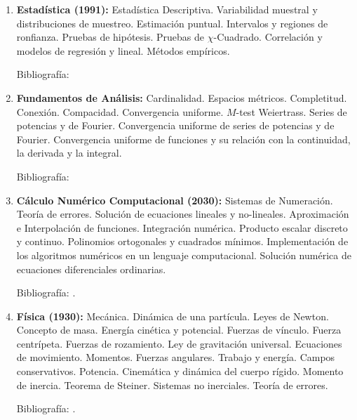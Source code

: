 \documentclass[a4paper, 12pt]{article}
\begin{document}
\begin{enumerate}
 \item \textbf{Estadística (1991):} Estadística Descriptiva. Variabilidad muestral y distribuciones de muestreo. Estimación puntual. Intervalos y regiones de ronfianza. Pruebas de hipótesis. Pruebas de $\chi$-Cuadrado. Correlación  y modelos de regresión y   lineal. Métodos empíricos. 

Bibliografía: \cite{wasserman, devore, witten, boente, mosche, johnku, triola}
 
\item \textbf{Fundamentos de Análisis:} Cardinalidad. Espacios métricos. Completitud. Conexión. Compacidad. Convergencia uniforme. $M$-test  Weiertrass. Series de potencias y de Fourier. Convergencia uniforme de series de potencias y de Fourier. Convergencia  uniforme de funciones y su relación con la continuidad, la  derivada y la  integral. 

Bibliografía: \cite{RogerGodement658,StephenAbbott134,Simmons671,MichealOSearcoid674,SatishShirali675,VictorBryant676,J.Dieudonne678,WalterRudin681,NikolaosKatzourakis684,VilmosKomornik685,VicenteMontesinos686}





\item\textbf{Cálculo Numérico Computacional (2030):} Sistemas de Numeración.
Teoría de errores. Solución de ecuaciones lineales y no-lineales.
Aproximación e Interpolación de funciones. Integración numérica.
Producto escalar discreto y continuo. Polinomios ortogonales y
cuadrados mínimos. Implementación de los algoritmos numéricos en
un lenguaje computacional. Solución numérica de ecuaciones diferenciales ordinarias.

Bibliografía: \cite{burden, cheney}.









\item\textbf{Física (1930):} Mecánica. Dinámica de una partícula. Leyes
de Newton. Concepto de masa. Energía cinética y potencial. Fuerzas
de vínculo. Fuerza centrípeta. Fuerzas de rozamiento. Ley de
gravitación universal. Ecuaciones de movimiento. Momentos. Fuerzas
angulares. Trabajo y energía. Campos conservativos.
Potencia. Cinemática y  dinámica del cuerpo rígido. Momento de
inercia. Teorema de Steiner. Sistemas no inerciales. Teoría de
errores.

Bibliografía: \cite{roederer, sears}.



\end{enumerate}
\end{document}
